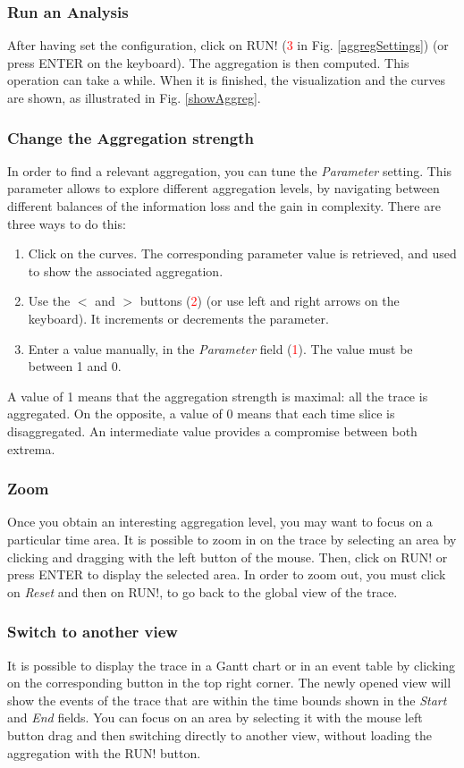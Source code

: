 \documentclass[twoside]{article}
\begin{document}
\begin{sloppypar}
\subsubsection{Run an Analysis}
After having set the configuration, click on RUN! (\textcolor{red}{3} in Fig. \ref{aggregSettings}) (or press ENTER on the keyboard). The aggregation is then computed. This operation can take a while. When it is finished, the visualization and the curves are shown, as illustrated in Fig. \ref{showAggreg}.

\subsubsection{Change the Aggregation strength}
In order to find a relevant aggregation, you can tune the \textit{Parameter} setting. This parameter allows to explore different aggregation levels, by navigating between different balances of the information loss and the gain in complexity. There are three ways to do this:
\begin{enumerate}
	\item Click on the curves. The corresponding parameter value is retrieved, and used to show the associated aggregation.
	\item Use the $<$ and $>$ buttons (\textcolor{red}{2}) (or use left and right arrows on the keyboard). It increments or decrements the parameter.
	\item Enter a value manually, in the \textit{Parameter} field (\textcolor{red}{1}). The value must be between 1 and 0.
\end{enumerate}
A value of 1 means that the aggregation strength is maximal: all the trace is aggregated. On the opposite, a value of 0 means that each time slice is disaggregated. An intermediate value provides a compromise between both extrema.

\subsubsection{Zoom}
Once you obtain an interesting aggregation level, you may want to focus on a particular time area. It is possible to zoom in on the trace by selecting an area by clicking and dragging with the left button of the mouse. Then, click on RUN! or press ENTER to display the selected area. In order to zoom out, you must click on \textit{Reset} and then on RUN!, to go back to the global view of the trace.

\subsubsection{Switch to another view}
It is possible to display the trace in a Gantt chart or in an event table by clicking on the corresponding button in the top right corner. The newly opened view will show the events of the trace that are within the time bounds shown in the \textit{Start} and \textit{End} fields. You can focus on an area by selecting it with the mouse left button drag and then switching directly to another view, without loading the aggregation with the RUN! button. 


\end{sloppypar}
\end{document}
